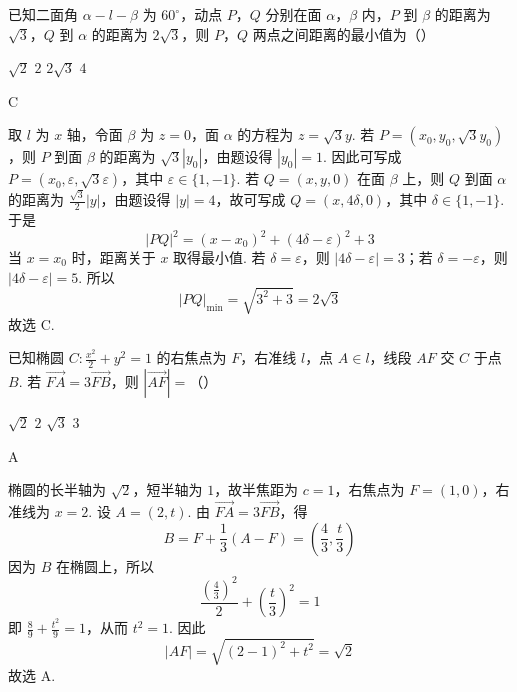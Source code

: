 \begin{problem}
已知二面角 \(\alpha - l - \beta\) 为 \(60^{\circ}\)，动点 \(P\)，\(Q\) 分别在面 \(\alpha\)，\(\beta\) 内，\(P\) 到 \(\beta\) 的距离为 \(\sqrt{3}\)，\(Q\) 到 \(\alpha\) 的距离为 \(2\sqrt{3}\)，则 \(P\)，\(Q\) 两点之间距离的最小值为（\quad）

\choices
    {\(\sqrt{2}\)}
    {\(2\)}
    {\(2\sqrt{3}\)}
    {\(4\)}
\end{problem}

\begin{answer}
C
\end{answer}

\begin{solution}
取 \(l\) 为 \(x\) 轴，令面 \(\beta\) 为 \(z=0\)，面 \(\alpha\) 的方程为 \(z=\sqrt{3}y\). 若 \(P=(x_0,y_0,\sqrt{3}y_0)\)，则 \(P\) 到面 \(\beta\) 的距离为 \(\sqrt{3}|y_0|\)，由题设得 \(|y_0|=1\). 因此可写成 \(P=(x_0,\varepsilon,\sqrt{3}\varepsilon)\)，其中 \(\varepsilon\in\{1,-1\}\). 若 \(Q=(x,y,0)\) 在面 \(\beta\) 上，则 \(Q\) 到面 \(\alpha\) 的距离为 \(\frac{\sqrt{3}}{2}|y|\)，由题设得 \(|y|=4\)，故可写成 \(Q=(x,4\delta,0)\)，其中 \(\delta\in\{1,-1\}\). 于是
\[
|PQ|^2=(x-x_0)^2+(4\delta-\varepsilon)^2+3
\]
当 \(x=x_0\) 时，距离关于 \(x\) 取得最小值. 若 \(\delta=\varepsilon\)，则 \(|4\delta-\varepsilon|=3\)；若 \(\delta=-\varepsilon\)，则 \(|4\delta-\varepsilon|=5\). 所以
\[
|PQ|_{\min}=\sqrt{3^2+3}=2\sqrt{3}
\]
故选 C.
\end{solution}

\begin{problem}
已知椭圆 \(C: \frac{x^2}{2} + y^2 = 1\) 的右焦点为 \(F\)，右准线 \(l\)，点 \(A \in l\)，线段 \(AF\) 交 \(C\) 于点 \(B\). 若 \(\overrightarrow{FA} = 3\overrightarrow{FB}\)，则 \(|\overrightarrow{AF}| =\)（\quad）

\choices
    {\(\sqrt{2}\)}
    {\(2\)}
    {\(\sqrt{3}\)}
    {\(3\)}
\end{problem}

\begin{answer}
A
\end{answer}

\begin{solution}
椭圆的长半轴为 \(\sqrt{2}\)，短半轴为 \(1\)，故半焦距为 \(c=1\)，右焦点为 \(F=(1,0)\)，右准线为 \(x=2\). 设 \(A=(2,t)\). 由 \(\overrightarrow{FA}=3\overrightarrow{FB}\)，得
\[
B=F+\frac{1}{3}(A-F)=\left(\frac{4}{3},\frac{t}{3}\right)
\]
因为 \(B\) 在椭圆上，所以
\[
\frac{(\frac{4}{3})^2}{2}+\left(\frac{t}{3}\right)^2=1
\]
即 \(\frac{8}{9}+\frac{t^2}{9}=1\)，从而 \(t^2=1\). 因此
\[
|AF|=\sqrt{(2-1)^2+t^2}=\sqrt{2}
\]
故选 A.
\end{solution}

